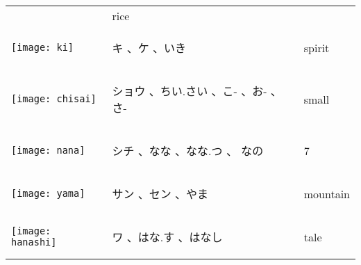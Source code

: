 \documentclass[a4paper,12pt]{extarticle}
\begin{document}
\begin{longtable}{|lp{6cm}p{4cm}|}
&
 rice
\\ 
\begin{minipage}{0.3\textwidth}
\centerline{
	\texttt{[image: ki]}
}
\end{minipage}
&
\begin{CJK}{UTF8}{min} キ 、ケ 、いき\end{CJK}
&
 spirit
\\ 
\begin{minipage}{0.3\textwidth}
\centerline{
	\texttt{[image: chisai]}
}
\end{minipage}
&
\begin{CJK}{UTF8}{min} ショウ 、ちい.さい 、こ- 、お- 、さ-\end{CJK}
&
 small
\\ 
\begin{minipage}{0.3\textwidth}
\centerline{
	\texttt{[image: nana]}
}
\end{minipage}
&
\begin{CJK}{UTF8}{min} シチ 、なな 、なな.つ 、 なの\end{CJK}
&
 7
\\ 
\begin{minipage}{0.3\textwidth}
\centerline{
	\texttt{[image: yama]}
}
\end{minipage}
&
\begin{CJK}{UTF8}{min} サン 、セン 、やま\end{CJK}
&
 mountain
\\ 
\begin{minipage}{0.3\textwidth}
\centerline{
	\texttt{[image: hanashi]}
}
\end{minipage}
&
\begin{CJK}{UTF8}{min} ワ 、はな.す 、はなし\end{CJK}
&
 tale

\end{longtable}
\end{document}
